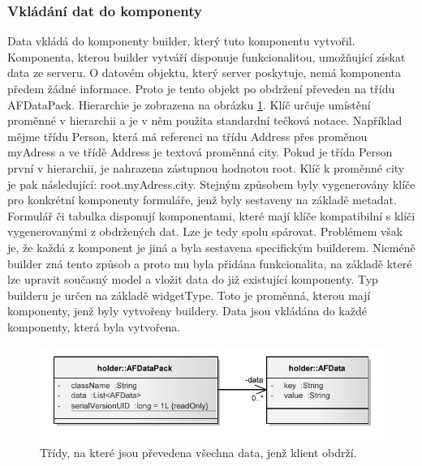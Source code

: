 \subsubsection{Vkládání dat do komponenty}
Data vkládá do komponenty builder, který tuto komponentu vytvořil. Komponenta, kterou builder vytváří disponuje funkcionalitou, umožňující získat data ze serveru. O datovém objektu, který server poskytuje, nemá komponenta předem žádné informace. Proto je tento objekt po obdržení převeden na třídu AFDataPack. Hierarchie je zobrazena na obrázku \ref{img:dataPack}. Klíč určuje umístění proměnné v hierarchii a je v něm použita standardní tečková notace. Například mějme třídu Person, která má referenci na třídu Address přes proměnou myAdress a ve třídě Address je textová proměnná city. Pokud je třída Person první v hierarchii, je nahrazena zástupnou hodnotou root. Klíč k proměnné city je pak následující: root.myAdress.city. Stejným způsobem byly vygenerovány klíče pro konkrétní komponenty formuláře, jenž byly sestaveny na základě metadat. Formulář či tabulka disponují komponentami, které mají klíče kompatibilní s klíči vygenerovanými z obdržených dat. Lze je tedy spolu spárovat. Problémem však je, že každá z komponent je jiná a byla sestavena specifickým builderem. Nicméně builder zná tento způsob a proto mu byla přidána funkcionalita, na základě které lze upravit současný model a vložit data do již existující komponenty. Typ builderu je určen na základě widgetType. Toto je proměnná, kterou mají komponenty, jenž byly vytvořeny buildery. Data jsou vkládána do každé komponenty, která byla vytvořena.

\begin{figure}[h!]
\begin{center}
\includegraphics{images/dataPack}
\caption{Třídy, na které jsou převedena všechna data, jenž klient obdrží.}
\label{img:dataPack}
\end{center}
\end{figure}

